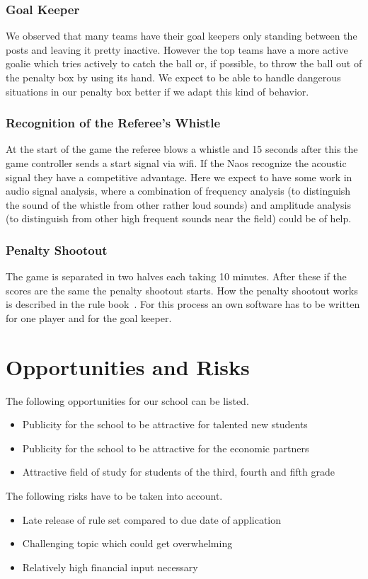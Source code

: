 \documentclass[12pt]{article}
\theoremstyle{definition}
\begin{document}
\subsubsection{Goal Keeper}
We observed that many teams have their goal keepers only standing between the posts and leaving it pretty inactive. However the top teams have a more active goalie which tries actively to catch the ball or, if possible, to throw the ball out of the penalty box by using its hand. We expect to be able to handle dangerous situations in our penalty box better if we adapt this kind of behavior.

\subsubsection{Recognition of the Referee's Whistle}
At the start of the game the referee blows a whistle and 15 seconds after this the game controller sends a start signal via wifi. If the Naos recognize the acoustic signal they have a competitive advantage. Here we expect to have some work in audio signal analysis, where a combination of frequency analysis (to distinguish the sound of the whistle from other rather loud sounds) and amplitude analysis (to distinguish from other high frequent sounds near the field) could be of help.

\subsubsection{Penalty Shootout}
The game is separated in two halves each taking 10 minutes. After these if the scores are the same the penalty shootout starts. How the penalty shootout works is described in the rule book~\cite{robocup_technical_committee_robocup_2016}. For this process an own software has to be written for one player and for the goal keeper. 


\section{Opportunities and Risks}
The following opportunities for our school can be listed.
\begin{itemize}
\item Publicity for the school to be attractive for talented new students
\item Publicity for the school to be attractive for the economic partners
\item Attractive field of study for students of the third, fourth and fifth grade
\end{itemize}
The following risks have to be taken into account.
\begin{itemize}
\item Late release of rule set compared to due date of application
\item Challenging topic which could get overwhelming
\item Relatively high financial input necessary
\end{itemize}
\end{document}

